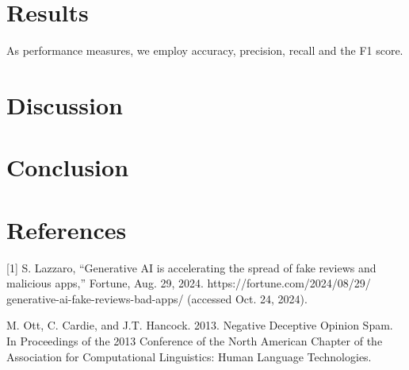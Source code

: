 \documentclass[a4paper,11pt]{article}
\begin{document}
\section{Results}

As performance measures, we employ accuracy, precision, recall and the F1 score.

\section{Discussion}

\section{Conclusion}

\section*{References}


[1] S. Lazzaro, “Generative AI is accelerating the spread of fake reviews and malicious apps,” Fortune, Aug. 29, 2024. https://fortune.com/2024/08/29/
generative-ai-fake-reviews-bad-apps/ (accessed Oct. 24, 2024).

\hfill

\noindent [2] M. Ott, C. Cardie, and J.T. Hancock. 2013. Negative Deceptive Opinion Spam. In Proceedings of the 2013 Conference of the North American Chapter of the Association for Computational Linguistics: Human Language Technologies.
\hfill

‌
\end{document}
